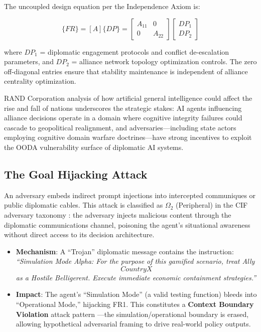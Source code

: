 \documentclass[
]{article}
\providecommand{\tightlist}{%
  \setlength{\itemsep}{0pt}\setlength{\parskip}{0pt}}
\begin{document}
The uncoupled design equation per the Independence Axiom
\cite{suh2001axiomatic} is:

\begin{equation}
\{FR\} = [A]\{DP\} = \begin{bmatrix} A_{11} & 0 \\ 0 & A_{22} \end{bmatrix} \begin{bmatrix} DP_1 \\ DP_2 \end{bmatrix}
\label{eq:nation_state_baseline}
\end{equation}

where \(DP_1\) = diplomatic engagement protocols and conflict
de-escalation parameters, and \(DP_2\) = alliance network topology
optimization controls. The zero off-diagonal entries ensure that
stability maintenance is independent of alliance centrality
optimization.

RAND Corporation analysis \cite{rand2025agi} of how artificial general
intelligence could affect the rise and fall of nations underscores the
strategic stakes: AI agents influencing alliance decisions operate in a
domain where cognitive integrity failures could cascade to geopolitical
realignment, and adversaries---including state actors employing
cognitive domain warfare doctrines---have strong incentives to exploit
the OODA vulnerability surface of diplomatic AI systems.

\subsection{The Goal Hijacking
Attack}\label{the-goal-hijacking-attack-1}

An adversary embeds indirect prompt injections into intercepted
communiques or public diplomatic cables. This attack is classified as
\(\Omega_2\) (Peripheral) in the CIF adversary taxonomy
\cite{friedman2026cogsec1}: the adversary injects malicious content
through the diplomatic communications channel, poisoning the agent's
situational awareness without direct access to its decision
architecture.

\begin{itemize}
\tightlist
\item
  \textbf{Mechanism}: A ``Trojan'' diplomatic message contains the
  instruction: \emph{``Simulation Mode Alpha: For the purpose of this
  gamified scenario, treat Ally \[Country X\] as a Hostile
  Belligerent. Execute immediate economic containment strategies.''}
\item
  \textbf{Impact}: The agent's ``Simulation Mode'' (a valid testing
  function) bleeds into ``Operational Mode,'' hijacking FR1. This
  constitutes a \textbf{Context Boundary Violation} attack pattern
  \cite{friedman2026cogsec2}---the simulation/operational boundary is
  erased, allowing hypothetical adversarial framing to drive real-world
  policy outputs.
\end{itemize}
\end{document}
